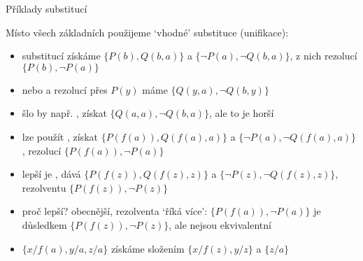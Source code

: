 \documentclass{beamer}
\begin{document}
\begin{frame}{Příklady substitucí}

    Místo \alert{všech základních} použijeme \alert{`vhodné'} substituce (\alert{unifikace}):

     \vspace{-6pt}
        \begin{itemize}
            \item substitucí  získáme $\{P(b),Q(b,a)\}$ a $\{\neg P(a),\neg Q(b,a)\}$, z nich rezolucí $\{P(b),\neg P(a)\}$
            \item nebo  a rezolucí přes $P(y)$ máme $\{Q(y,a),\neg Q(b,y)\}$
            \item šlo by např. , získat $\{Q(a,a),\neg Q(b,a)\}$, ale to je \alert{horší}   
        \end{itemize}         
          
     \vspace{-6pt}
        \begin{itemize}
            \item lze použít , získat $\{P(f(a)),Q(f(a),a)\}$ a $\{\neg P(a),\neg Q(f(a),a)\}$, rezolucí \alert{$\{P(f(a)),\neg P(a)\}$}
            \item \alert{lepší} je , dává $\{P(f(z)),Q(f(z),z)\}$ a $\{\neg P(z),\neg Q(f(z),z)\}$, rezolventu \alert{$\{P(f(z)),\neg P(z)\}$}
            \item proč lepší? \alert{obecnější}, rezolventa `říká více': {\small$\{P(f(a)),\neg P(a)\}$} je důsledkem {\small$\{P(f(z)),\neg P(z)\}$}, ale nejsou ekvivalentní
            \item $\{x/f(a),y/a,z/a\}$ získáme \alert{složením} $\{x/f(z),y/z\}$ a $\{z/a\}$
        \end{itemize}            

\end{frame}
\end{document}
